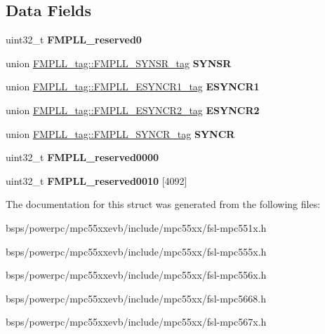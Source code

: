 \subsection*{Data Fields}
\begin{DoxyCompactItemize}
\item 
\mbox{\label{structFMPLL__tag_a4831e7d9f73827714d3852b5e206df93}} 
uint32\+\_\+t {\bfseries F\+M\+P\+L\+L\+\_\+reserved0}
\item 
\mbox{\label{structFMPLL__tag_a9093d4939352add0e43da93c4794a3f4}} 
union \mbox{\hyperlink{unionFMPLL__tag_1_1FMPLL__SYNSR__tag}{F\+M\+P\+L\+L\+\_\+tag\+::\+F\+M\+P\+L\+L\+\_\+\+S\+Y\+N\+S\+R\+\_\+tag}} {\bfseries S\+Y\+N\+SR}
\item 
\mbox{\label{structFMPLL__tag_a8e4780e7138a2071a1cc2c36946879e2}} 
union \mbox{\hyperlink{unionFMPLL__tag_1_1FMPLL__ESYNCR1__tag}{F\+M\+P\+L\+L\+\_\+tag\+::\+F\+M\+P\+L\+L\+\_\+\+E\+S\+Y\+N\+C\+R1\+\_\+tag}} {\bfseries E\+S\+Y\+N\+C\+R1}
\item 
\mbox{\label{structFMPLL__tag_a155b0b2ac13da2820f8d4a93baa57a68}} 
union \mbox{\hyperlink{unionFMPLL__tag_1_1FMPLL__ESYNCR2__tag}{F\+M\+P\+L\+L\+\_\+tag\+::\+F\+M\+P\+L\+L\+\_\+\+E\+S\+Y\+N\+C\+R2\+\_\+tag}} {\bfseries E\+S\+Y\+N\+C\+R2}
\item 
\mbox{\label{structFMPLL__tag_abaaa82432d8b7fb13b49893db8035772}} 
union \mbox{\hyperlink{unionFMPLL__tag_1_1FMPLL__SYNCR__tag}{F\+M\+P\+L\+L\+\_\+tag\+::\+F\+M\+P\+L\+L\+\_\+\+S\+Y\+N\+C\+R\+\_\+tag}} {\bfseries S\+Y\+N\+CR}
\item 
\mbox{\label{structFMPLL__tag_ad0c2b91a29c82263333d5c184ad08391}} 
uint32\+\_\+t {\bfseries F\+M\+P\+L\+L\+\_\+reserved0000}
\item 
\mbox{\label{structFMPLL__tag_a777aefdce93142bff7b99dc7868243bd}} 
uint32\+\_\+t {\bfseries F\+M\+P\+L\+L\+\_\+reserved0010} \mbox{[}4092\mbox{]}
\end{DoxyCompactItemize}


The documentation for this struct was generated from the following files\+:\begin{DoxyCompactItemize}
\item 
bsps/powerpc/mpc55xxevb/include/mpc55xx/fsl-\/mpc551x.\+h\item 
bsps/powerpc/mpc55xxevb/include/mpc55xx/fsl-\/mpc555x.\+h\item 
bsps/powerpc/mpc55xxevb/include/mpc55xx/fsl-\/mpc556x.\+h\item 
bsps/powerpc/mpc55xxevb/include/mpc55xx/fsl-\/mpc5668.\+h\item 
bsps/powerpc/mpc55xxevb/include/mpc55xx/fsl-\/mpc567x.\+h\end{DoxyCompactItemize}
